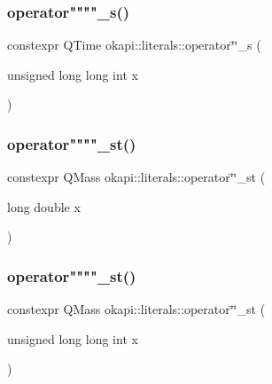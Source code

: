 \mbox{\label{namespaceokapi_1_1literals_a52e2803db21d89b8f608c32ad57a1d1d}} 
\subsubsection{\texorpdfstring{operator""""\_s()}{operator""\_s()}\hspace{0.1cm}{\footnotesize\ttfamily [2/2]}}
{\footnotesize\ttfamily constexpr Q\+Time okapi\+::literals\+::operator\char`\"{}\char`\"{}\+\_\+s (\begin{DoxyParamCaption}\item[{unsigned long long int}]{x }\end{DoxyParamCaption})}

\mbox{\label{namespaceokapi_1_1literals_a54e0f4ad4668efdc68b0ff3350ece027}} 
\subsubsection{\texorpdfstring{operator""""\_st()}{operator""\_st()}\hspace{0.1cm}{\footnotesize\ttfamily [1/2]}}
{\footnotesize\ttfamily constexpr Q\+Mass okapi\+::literals\+::operator\char`\"{}\char`\"{}\+\_\+st (\begin{DoxyParamCaption}\item[{long double}]{x }\end{DoxyParamCaption})}

\mbox{\label{namespaceokapi_1_1literals_a62cd539466770bbc45de269c4120021b}} 
\subsubsection{\texorpdfstring{operator""""\_st()}{operator""\_st()}\hspace{0.1cm}{\footnotesize\ttfamily [2/2]}}
{\footnotesize\ttfamily constexpr Q\+Mass okapi\+::literals\+::operator\char`\"{}\char`\"{}\+\_\+st (\begin{DoxyParamCaption}\item[{unsigned long long int}]{x }\end{DoxyParamCaption})}

